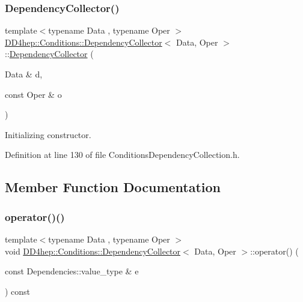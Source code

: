 \subsubsection{\texorpdfstring{Dependency\+Collector()}{DependencyCollector()}}
{\footnotesize\ttfamily template$<$typename Data , typename Oper $>$ \\
\hyperlink{class_d_d4hep_1_1_conditions_1_1_dependency_collector}{D\+D4hep\+::\+Conditions\+::\+Dependency\+Collector}$<$ Data, Oper $>$\+::\hyperlink{class_d_d4hep_1_1_conditions_1_1_dependency_collector}{Dependency\+Collector} (\begin{DoxyParamCaption}\item[{Data \&}]{d,  }\item[{const Oper \&}]{o }\end{DoxyParamCaption})\hspace{0.3cm}{\ttfamily [inline]}}



Initializing constructor. 



Definition at line 130 of file Conditions\+Dependency\+Collection.\+h.



\subsection{Member Function Documentation}
\hypertarget{class_d_d4hep_1_1_conditions_1_1_dependency_collector_a53765a0a554a15af435754b94c165e31}{}\label{class_d_d4hep_1_1_conditions_1_1_dependency_collector_a53765a0a554a15af435754b94c165e31} 
\subsubsection{\texorpdfstring{operator()()}{operator()()}}
{\footnotesize\ttfamily template$<$typename Data , typename Oper $>$ \\
void \hyperlink{class_d_d4hep_1_1_conditions_1_1_dependency_collector}{D\+D4hep\+::\+Conditions\+::\+Dependency\+Collector}$<$ Data, Oper $>$\+::operator() (\begin{DoxyParamCaption}\item[{const Dependencies\+::value\+\_\+type \&}]{e }\end{DoxyParamCaption}) const\hspace{0.3cm}{\ttfamily [inline]}}



